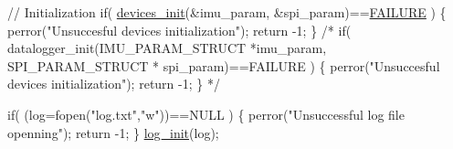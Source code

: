\begin{DoxyCode}
\textcolor{comment}{// Initialization}
  \textcolor{keywordflow}{if}( \hyperlink{communication_01_07C_xC3_xB3pia_01em_01conflito_01de_01Andr_xC3_xA9_01Carvalho_012013-04-26_08_8c_adfe7e60b85fe68542adde08e59151441}{devices\_init}(&imu\_param, &spi\_param)==\hyperlink{communication_01_07C_xC3_xB3pia_01em_01conflito_01de_01Caio_01Gustavo_01Mesquita_01Angelo_012013-04-28_08_8h_a6d58f9ac447476b4e084d7ca383f5183}{FAILURE} )
  \{
    perror(\textcolor{stringliteral}{"Unsuccesful devices initialization"});
    \textcolor{keywordflow}{return} -1;
  \}
\textcolor{comment}{/*  if( datalogger\_init(IMU\_PARAM\_STRUCT *imu\_param, SPI\_PARAM\_STRUCT *
      spi\_param)==FAILURE )}
\textcolor{comment}{  \{}
\textcolor{comment}{    perror("Unsuccesful devices initialization");}
\textcolor{comment}{    return -1;}
\textcolor{comment}{  \}}
\textcolor{comment}{*/}  
  
  \textcolor{keywordflow}{if}( (log=fopen(\textcolor{stringliteral}{"log.txt"},\textcolor{stringliteral}{"w"}))==NULL )
  \{
    perror(\textcolor{stringliteral}{"Unsuccessful log file openning"});
    \textcolor{keywordflow}{return} -1;
  \}
  \hyperlink{main_01_07Caio_01Gustavo_01Mesquita_01Angelo's_01conflicted_01copy_012012-11-23_08_8c_aa570d24f638774bf52f70f1d9d9d45f8}{log\_init}(log);
  

\end{DoxyCode}
